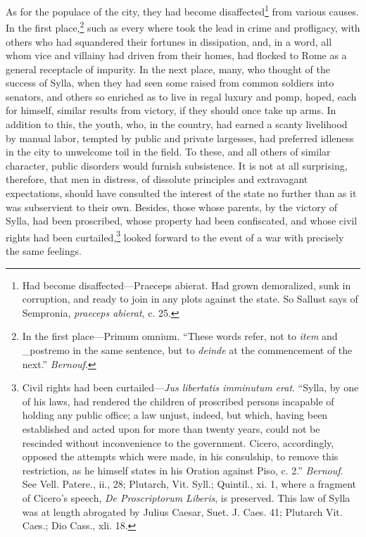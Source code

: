 As for the populace of the city, they had become disaffected\footnote{Had become disaffected—Praeceps abierat. Had grown demoralized,
sunk in corruption, and ready to join in any plots against the state.
So Sallust says of Sempronia, \emph{praeceps abierat}, c. 25.} from
various causes. In the first place,\footnote{In the first place—Primum omnium. ``These words refer, not to
\emph{item} and \_postremo in the same sentence, but to \emph{deinde} at the
commencement of the next.'' \emph{Bernouf}.} such as every where took the
lead in crime and profligacy, with others who had squandered their
fortunes in dissipation, and, in a word, all whom vice and villainy
had driven from their homes, had flocked to Rome as a general
receptacle of impurity. In the next place, many, who thought of the
success of Sylla, when they had seen some raised from common soldiers
into senators, and others so enriched as to live in regal luxury and
pomp, hoped, each for himself, similar results from victory, if they
should once take up arms. In addition to this, the youth, who, in the
country, had earned a scanty livelihood by manual labor, tempted by
public and private largesses, had preferred idleness in the city to
unwelcome toil in the field. To these, and all others of similar
character, public disorders would furnish subsistence. It is not at
all surprising, therefore, that men in distress, of dissolute
principles and extravagant expectations, should have consulted the
interest of the state no further than as it was subservient to their
own. Besides, those whose parents, by the victory of Sylla, had been
proscribed, whose property had been confiscated, and whose civil
rights had been curtailed,\footnote{Civil rights had been curtailed—\emph{Jus libertatis imminutum
erat}. ``Sylla, by one of his laws, had rendered the children of
proscribed persons incapable of holding any public office; a law
unjust, indeed, but which, having been established and acted upon for
more than twenty years, could not be rescinded without inconvenience
to the government. Cicero, accordingly, opposed the attempts which
were made, in his consulship, to remove this restriction, as he
himself states in his Oration against Piso, c. 2.'' \emph{Bernouf}. See
Vell. Patere., ii., 28; Plutarch, Vit. Syll.; Quintil., xi. 1, where a
fragment of Cicero's speech, \emph{De Proscriptorum Liberis}, is preserved.
This law of Sylla was at length abrogated by Julius Caesar, Suet. J.
Caes. 41; Plutarch Vit. Caes.; Dio Cass., xli. 18.} looked forward to the event of a war
with precisely the same feelings.


